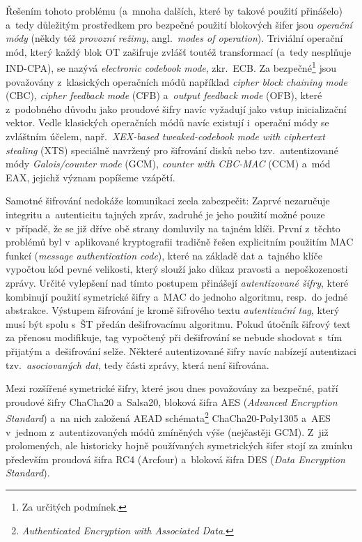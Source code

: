 Řešením tohoto problému (a~mnoha dalších, které by takové použití přinášelo) a~tedy dů\-le\-ži\-tým prostředkem pro bezpečné použití blokových šifer jsou \emph{operační módy} (někdy též \emph{provozní režimy}, angl.\ \textit{modes of operation}). Triviální operační mód, který každý blok OT zašifruje zvlášť toutéž transformací (a~tedy nesplňuje IND-CPA), se nazývá \textit{electronic codebook mode}, zkr.~ECB. Za bezpečné\footnote{Za určitých podmínek.} jsou považovány z~klasických operačních módů například \textit{cipher block chaining mode} (CBC), \textit{cipher feedback mode} (CFB) a~\textit{output feedback mode} (OFB), které z~podobného důvodu jako proudové šifry navíc vyžadují jako vstup inicializační vektor. Vedle klasických operačních módů navíc existují i~operační módy se zvláštním účelem, např.\ \textit{XEX-based tweaked-codebook mode with ciphertext stealing} (XTS) speciálně navržený pro šifrování disků nebo tzv.~autentizované módy \textit{Galois/counter mode} (GCM), \textit{counter with CBC-MAC} (CCM) a~mód EAX, jejichž význam popíšeme vzápětí.

Samotné šifrování ne\-do\-ká\-že komunikaci zcela zabezpečit: Zaprvé nezaručuje integritu a~autenticitu tajných zpráv, zadruhé je jeho použití možné pouze v~případě, že se již dříve obě strany domluvily na tajném klíči. První z~těchto problémů byl v~aplikované kryptografii tradičně řešen explicitním použitím MAC funkcí (\textit{message authentication code}), které na základě dat a~tajného klíče vypočtou kód pevné velikosti, který slouží jako důkaz pravosti a~nepoškozenosti zprávy. Určité vylepšení nad tímto postupem přinášejí \emph{autentizované šifry}, které kombinují použití symetrické šifry a~MAC do jednoho algoritmu, resp.\ do jedné abstrakce. Výstupem šifrování je kromě šifrového textu \emph{autentizační tag}, který musí být spolu s~ŠT předán dešifrovacímu algoritmu. Pokud útočník šifrový text za přenosu modifikuje, tag vypočtený při dešifrování se nebude shodovat s~tím přijatým a~dešifrování selže. Některé autentizované šifry navíc nabízejí autentizaci tzv.~\emph{asociovaných dat}, tedy části zprávy, která není šifrována.~\cite{Dworkin2007}

Mezi rozšířené symetrické šifry, které jsou dnes považovány za bezpečné, patří proudové šifry ChaCha20 a~Salsa20, bloková šifra AES (\textit{Advanced Encryption Standard}) a~na nich založená AEAD schémata\footnote{\textit{Authenticated Encryption with Associated Data}.} ChaCha20-Poly1305 a~AES v~jednom z~autentizovaných módů zmíněných výše (nejčastěji GCM). Z~již prolomených, ale historicky hojně používaných symetrických šifer stojí za zmínku především proudová šifra RC4 (Arcfour) a~bloková šifra DES (\textit{Data Encryption Standard}).

